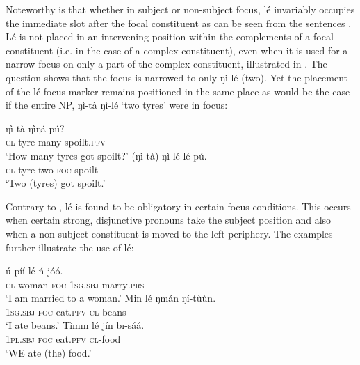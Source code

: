 \documentclass[output=paper,colorlinks,citecolor=brown]{langscibook}
\begin{document}
Noteworthy is that whether in subject or non-subject focus, lé invariably occupies the immediate slot after the focal constituent as can be seen from the sentences . Lé is not placed in an intervening position within the complements of a focal constituent (i.e. in the case of a complex constituent), even when it is used for a narrow focus on only a part of the complex constituent, illustrated in . The question  shows that the focus is narrowed to only ŋì-lé (two). Yet the placement of the lé focus marker  remains positioned in the same place as would be the case if the entire NP, ŋì-tà  ŋì-lé ‘two tyres’ were in focus:

\ea%
    \label{ex:bisilki:23}
    \ea\label{ex:bisilki:23a}
    \gll    ŋì-tà		ŋìŋá		pú?\\
            \textsc{cl-}tyre	many		spoilt\textsc{.pfv}\\
    \glt    ‘How many tyres got spoilt?’
    \ex\label{ex:bisilki:23b}
    \gll    (ŋì-tà)		ŋì-lé	lé	pú.\\
            \textsc{cl-}tyre	two	\textsc{foc}	spoilt\\
    \glt    ‘Two (tyres)  got spoilt.’
    \z
\z

Contrary to \citet{Schwarz2009}, lé is found to be obligatory in certain focus conditions. This occurs when certain strong, disjunctive pronouns take the subject position and also when a non-subject constituent is moved to the left periphery. The examples  further illustrate the use of lé:

\ea%
    \label{ex:bisilki:24}
    \ea\label{ex:bisilki:24a}
    \gll    ú-píí		lé	ń		jóó.\\
            \textsc{cl-}woman	\textsc{foc}	\textsc{1sg.sbj}	marry\textsc{.prs}\\
    \glt    ‘I am married to a woman.’
    \ex\label{ex:bisilki:24b}
    \gll    Min	lé	ŋmán	ŋí-tùùn.\\
            \textsc{1sg.sbj}	\textsc{foc}	eat\textsc{.pfv}	\textsc{cl-}beans\\
    \glt    ‘I ate beans.’
    \ex\label{ex:bisilki:24c}
    \gll    Tìmīn		lé	jín		bī-sáá.\\
            \textsc{1pl.sbj}	\textsc{foc}	eat\textsc{.pfv}	\textsc{cl-}food\\
    \glt    ‘WE ate (the) food.’
    \z
\z
\end{document}
